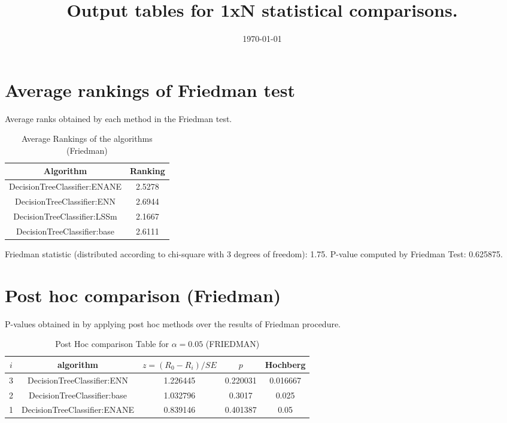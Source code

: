\documentclass[a4paper,10pt]{article}
\title{Output tables for 1xN statistical comparisons.}
\author{}
\date{\today}
\begin{document}
\begin{landscape}
\pagestyle{empty}
\maketitle
\thispagestyle{empty}

\section{Average rankings of Friedman test}


Average ranks obtained by each method in the Friedman test.

\begin{table}[!htp]
\centering
\begin{tabular}{|c|c|}\hline
Algorithm&Ranking\\\hline
DecisionTreeClassifier:ENANE&2.5278\\DecisionTreeClassifier:ENN&2.6944\\DecisionTreeClassifier:LSSm&2.1667\\DecisionTreeClassifier:base&2.6111\\\hline\end{tabular}
\caption{Average Rankings of the algorithms (Friedman)}
\end{table}

Friedman statistic (distributed according to chi-square with 3 degrees of freedom): 1.75. \newline P-value computed by Friedman Test: 0.625875.\newline


\newpage

\section{Post hoc comparison (Friedman)}


P-values obtained in by applying post hoc methods over the results of Friedman procedure.

\begin{table}[!htp]
\centering\footnotesize
\begin{tabular}{ccccc}
$i$&algorithm&$z=(R_0 - R_i)/SE$&$p$&Hochberg \\
\hline3&DecisionTreeClassifier:ENN&1.226445&0.220031&0.016667\\2&DecisionTreeClassifier:base&1.032796&0.3017&0.025\\1&DecisionTreeClassifier:ENANE&0.839146&0.401387&0.05\\\hline
\end{tabular}
\caption{Post Hoc comparison Table for $\alpha=0.05$ (FRIEDMAN)}
\end{table}
\newpage


\end{landscape}
\end{document}
